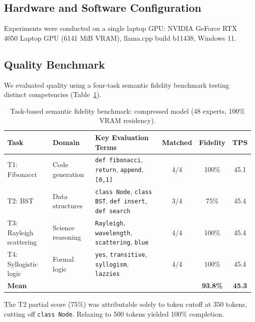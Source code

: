 \documentclass[10pt]{article}
\begin{document}
\subsection{Hardware and Software Configuration}
Experiments were conducted on a single laptop GPU: NVIDIA GeForce RTX 4050 Laptop GPU (6141 MiB VRAM), llama.cpp build b11438, Windows 11.

\subsection{Quality Benchmark}
We evaluated quality using a four-task semantic fidelity benchmark testing distinct competencies (Table~\ref{tab:benchmark}).

\begin{table}[ht]
\centering
\small
\caption{Task-based semantic fidelity benchmark: compressed model (48 experts, 100\% VRAM residency).}
\label{tab:benchmark}
\begin{tabular}{llp{4.2cm}ccc}
\toprule
\textbf{Task} & \textbf{Domain} & \textbf{Key Evaluation Terms} & \textbf{Matched} & \textbf{Fidelity} & \textbf{TPS} \\
\midrule
T1: Fibonacci & Code generation & \texttt{def fibonacci}, \texttt{return}, \texttt{append}, \texttt{[0,1]} & 4/4 & 100\% & 45.1 \\
T2: BST & Data structures & \texttt{class Node}, \texttt{class BST}, \texttt{def insert}, \texttt{def search} & 3/4 & 75\% & 45.4 \\
T3: Rayleigh scattering & Science reasoning & \texttt{Rayleigh}, \texttt{wavelength}, \texttt{scattering}, \texttt{blue} & 4/4 & 100\% & 45.4 \\
T4: Syllogistic logic & Formal logic & \texttt{yes}, \texttt{transitive}, \texttt{syllogism}, \texttt{lazzies} & 4/4 & 100\% & 45.4 \\
\midrule
\textbf{Mean} & & & & \textbf{93.8\%} & \textbf{45.3} \\
\bottomrule
\end{tabular}
\end{table}

The T2 partial score (75\%) was attributable solely to token cutoff at 350 tokens, cutting off \texttt{class Node}. Relaxing to 500 tokens yielded 100\% completion.
\end{document}
